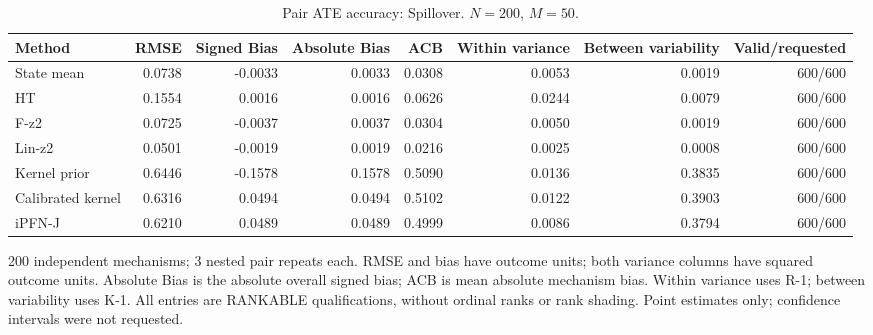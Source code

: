 \begin{table}[tb]
\centering
\scriptsize
\caption{Pair ATE accuracy: Spillover. $N=200$, $M=50$.}
\begin{tabular}{lrrrrrrr}
\toprule
Method & RMSE & Signed Bias & Absolute Bias & ACB & Within variance & Between variability & Valid/requested \\
\midrule
State mean & 0.0738 & -0.0033 & 0.0033 & 0.0308 & 0.0053 & 0.0019 & 600/600 \\
HT & 0.1554 & 0.0016 & 0.0016 & 0.0626 & 0.0244 & 0.0079 & 600/600 \\
F-z2 & 0.0725 & -0.0037 & 0.0037 & 0.0304 & 0.0050 & 0.0019 & 600/600 \\
Lin-z2 & 0.0501 & -0.0019 & 0.0019 & 0.0216 & 0.0025 & 0.0008 & 600/600 \\
Kernel prior & 0.6446 & -0.1578 & 0.1578 & 0.5090 & 0.0136 & 0.3835 & 600/600 \\
Calibrated kernel & 0.6316 & 0.0494 & 0.0494 & 0.5102 & 0.0122 & 0.3903 & 600/600 \\
iPFN-J & 0.6210 & 0.0489 & 0.0489 & 0.4999 & 0.0086 & 0.3794 & 600/600 \\
\bottomrule
\end{tabular}
\par\smallskip\begin{minipage}{\linewidth}\scriptsize
200 independent mechanisms; 3 nested pair repeats each. RMSE and bias have outcome units; both variance columns have squared outcome units. Absolute Bias is the absolute overall signed bias; ACB is mean absolute mechanism bias. Within variance uses R-1; between variability uses K-1. All entries are RANKABLE qualifications, without ordinal ranks or rank shading. Point estimates only; confidence intervals were not requested.
\end{minipage}\end{table}
